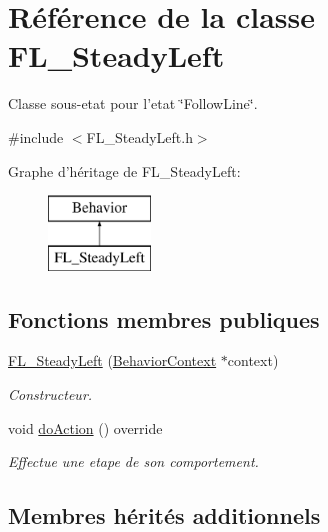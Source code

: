 \hypertarget{class_f_l___steady_left}{\section{Référence de la classe F\-L\-\_\-\-Steady\-Left}
\label{class_f_l___steady_left}
}


Classe sous-\/etat pour l'etat \char`\"{}\-Follow\-Line\char`\"{}.  




{\ttfamily \#include $<$F\-L\-\_\-\-Steady\-Left.\-h$>$}

Graphe d'héritage de F\-L\-\_\-\-Steady\-Left\-:\begin{figure}[H]
\begin{center}
\leavevmode
\includegraphics[height=2.000000cm]{class_f_l___steady_left}
\end{center}
\end{figure}
\subsection*{Fonctions membres publiques}
{\bf }\par
\begin{DoxyCompactItemize}
\item 
\hyperlink{class_f_l___steady_left_a99360fe370bf684a4000eb8147292a2b}{F\-L\-\_\-\-Steady\-Left} (\hyperlink{class_behavior_context}{Behavior\-Context} $\ast$context)
\begin{DoxyCompactList}\small\item\em Constructeur. \end{DoxyCompactList}\item 
void \hyperlink{class_f_l___steady_left_aa549ba6f52214d98054caea705f043b5}{do\-Action} () override
\begin{DoxyCompactList}\small\item\em Effectue une etape de son comportement. \end{DoxyCompactList}\end{DoxyCompactItemize}

\subsection*{Membres hérités additionnels}



